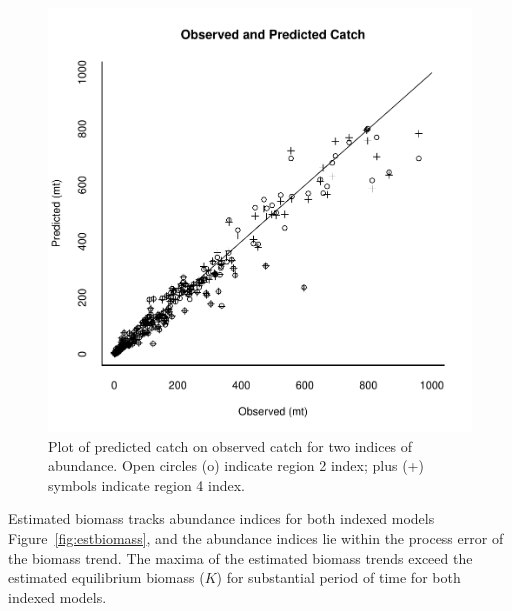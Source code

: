\documentclass[12pt,letterpaper]{article}
\begin{document}
\begin{figure}
\begin{center}
\includegraphics[height=0.45\textheight]{./4-gear-runs_multiOPcatch.pdf}
\caption{Plot of predicted catch on observed catch for two indices of
abundance.
Open circles (o) indicate region 2 index; plus (+) symbols indicate
region 4 index.
\label{fig:mopcatch}
}
\end{center}
\end{figure}

Estimated biomass tracks abundance indices for both indexed models
Figure~\ref{fig:estbiomass}, and the abundance indices lie within the
process error of the biomass trend.
The maxima of the estimated biomass trends exceed the
estimated equilibrium biomass ($K$) for substantial period of time for
both indexed models.
\end{document}
